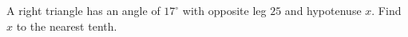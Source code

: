 A right triangle has an angle of $17^\circ$ with opposite leg $25$ and hypotenuse $x$. Find $x$ to the nearest tenth.
